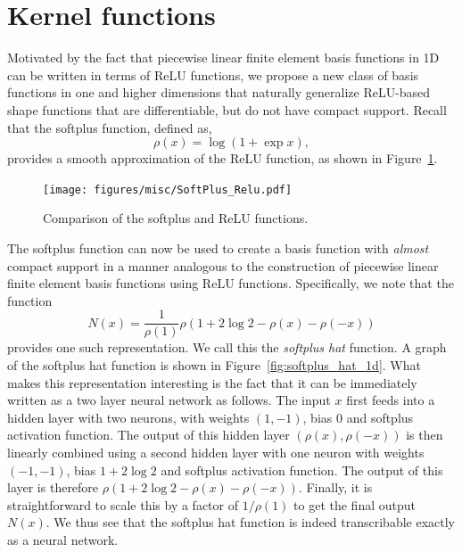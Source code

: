 \documentclass[12pt]{article}
\begin{document}
\section{Kernel functions} \label{app:softplus}
Motivated by the fact that piecewise linear finite element basis functions in 1D can be written in terms of ReLU functions, we propose a new class of basis functions in one and higher dimensions that naturally generalize ReLU-based shape functions that are differentiable, but do not have compact support. Recall that the softplus function, defined as,
\begin{equation} \label{eq:softplus}
\rho(x) = \log (1 + \exp x),
\end{equation}
provides a smooth approximation of the ReLU function, as shown in Figure~\ref{fig:softplus_relu}.

\begin{figure}[htpb]
\centering
\texttt{[image: figures/misc/SoftPlus\_Relu.pdf]}
\caption{Comparison of the softplus and ReLU functions.}
\label{fig:softplus_relu}
\end{figure}

The softplus function can now be used to create a basis function with \emph{almost} compact support in a manner analogous to the construction of piecewise linear finite element basis functions using ReLU functions. Specifically, we note that the function
\begin{displaymath}
N(x) = \frac{1}{\rho(1)}\rho\left(1 + 2\log 2 - \rho(x) - \rho(-x)\right)
\end{displaymath}
provides one such representation. We call this the \emph{softplus hat} function. A graph of the softplus hat function is shown in Figure~\ref{fig:softplus_hat_1d}. What makes this representation interesting is the fact that it can be immediately written as a two layer neural network as follows.  The input $x$ first feeds into a hidden layer with two neurons, with weights $(1, -1)$, bias $0$ and softplus activation function. The output of this hidden layer $(\rho(x), \rho(-x))$ is then linearly combined using a second hidden layer with one neuron with weights $(-1, -1)$, bias $1 + 2\log 2$ and softplus activation function. The output of this layer is therefore $\rho\left(1 + 2\log 2 - \rho(x) - \rho(-x)\right)$. Finally, it is straightforward to scale this by a factor of $1/\rho(1)$ to get the final output $N(x)$. We thus see that the softplus hat function is indeed transcribable exactly as a neural network.
\end{document}
